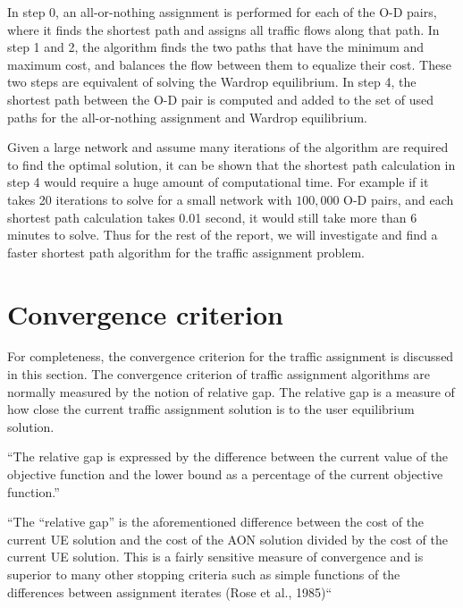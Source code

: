 In step 0, an all-or-nothing assignment is performed for each of the O-D pairs,
where it finds the shortest path and assigns all traffic flows along that path.
In step 1 and 2, the algorithm finds the two paths that have the minimum and maximum cost, and balances the flow between them to equalize their cost.
These two steps are equivalent of solving the Wardrop equilibrium.
In step 4, the shortest path between the O-D pair is computed and added to the set of used paths for the all-or-nothing assignment and Wardrop equilibrium.

Given a large network and assume many iterations of the algorithm are required to find the optimal solution,
it can be shown that the shortest path calculation in step 4 would require a huge amount of computational time.
For example if it takes 20 iterations to solve for a small network with $100,000$ O-D pairs,
and each shortest path calculation takes 0.01 second,
it would still take more than 6 minutes to solve.
Thus for the rest of the report,
we will investigate and find a faster shortest path algorithm for the traffic assignment problem.

\section{Convergence criterion} \label{sec:convergence}
For completeness, the convergence criterion for the traffic assignment is discussed in this section.
The convergence criterion of traffic assignment algorithms are normally measured by the notion of relative gap.
The relative gap is a measure of how close the current traffic assignment solution is to the user equilibrium solution.

``The relative gap is expressed by the difference between the current value of 
the objective function and the lower bound as a percentage of the current objective function.''\cite{Rose}

``The ``relative gap'' is the aforementioned difference between the cost of the
current UE solution and the cost of the AON solution divided by the cost of the
current UE solution. This is a fairly sensitive measure of convergence and is
superior to many other stopping criteria such as simple functions of the
differences between assignment iterates (Rose et al., 1985)`` \cite{Howard}

